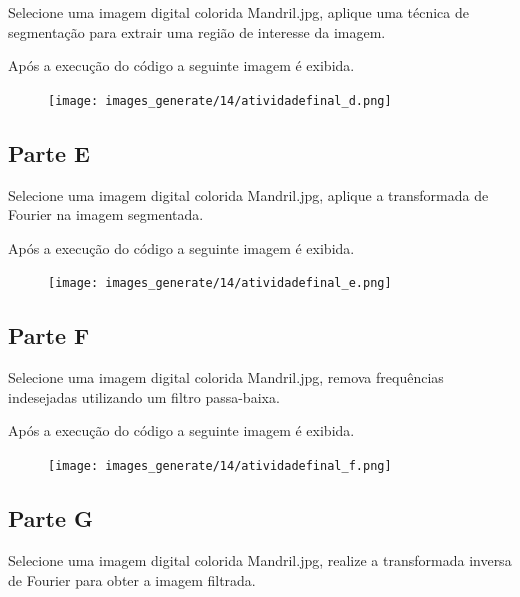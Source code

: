 \documentclass[10pt,a4paper]{article}
\begin{document}
Selecione uma imagem digital colorida Mandril.jpg, aplique uma técnica de segmentação para extrair uma região de interesse da imagem.



Após a execução do código a seguinte imagem é exibida.

\begin{figure}[H]
    \centering
    {{\texttt{[image: images\_generate/14/atividadefinal\_d.png]}}}
\end{figure}

\subsection{Parte E}

Selecione uma imagem digital colorida Mandril.jpg, aplique a transformada de Fourier na imagem segmentada. 



Após a execução do código a seguinte imagem é exibida.

\begin{figure}[H]
    \centering
    {{\texttt{[image: images\_generate/14/atividadefinal\_e.png]}}}
\end{figure}

\subsection{Parte F}

Selecione uma imagem digital colorida Mandril.jpg, remova frequências indesejadas utilizando um filtro passa-baixa. 



Após a execução do código a seguinte imagem é exibida.

\begin{figure}[H]
    \centering
    {{\texttt{[image: images\_generate/14/atividadefinal\_f.png]}}}
\end{figure}

\subsection{Parte G}

Selecione uma imagem digital colorida Mandril.jpg, realize a transformada inversa de Fourier para obter a imagem filtrada.


\end{document}
